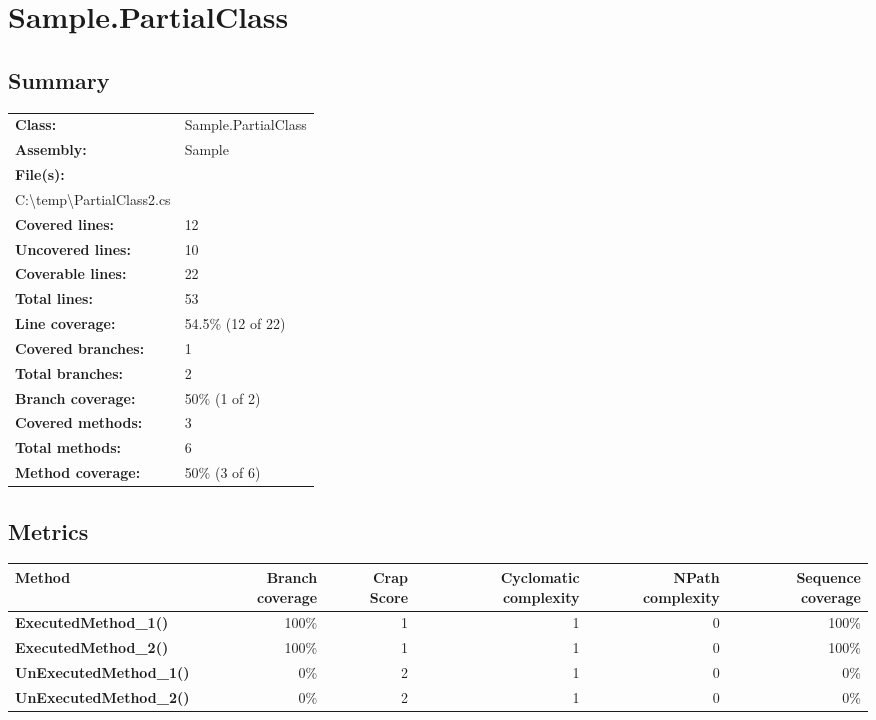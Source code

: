 \documentclass[a4paper,landscape,10pt]{article}
\begin{document}
\section{Sample.PartialClass}
\subsection{Summary}
\begin{longtable}[l]{ll}
\textbf{Class:} & Sample.PartialClass\\
\textbf{Assembly:} & Sample\\
\textbf{File(s):} & \begin{minipage}[t]{12cm}{C:\textbackslash temp\textbackslash PartialClass.cs\\C:\textbackslash temp\textbackslash PartialClass2.cs}\end{minipage} \\
\textbf{Covered lines:} & 12\\
\textbf{Uncovered lines:} & 10\\
\textbf{Coverable lines:} & 22\\
\textbf{Total lines:} & 53\\
\textbf{Line coverage:} & 54.5\% (12 of 22)\\
\textbf{Covered branches:} & 1\\
\textbf{Total branches:} & 2\\
\textbf{Branch coverage:} & 50\% (1 of 2)\\
\textbf{Covered methods:} & 3\\
\textbf{Total methods:} & 6\\
\textbf{Method coverage:} & 50\% (3 of 6)\\
\end{longtable}
\subsection{Metrics}
\begin{longtable}[l]{|l|r|r|r|r|r|}
\hline
\textbf{Method} & \textbf{Branch coverage} & \textbf{Crap Score} & \textbf{Cyclomatic complexity} & \textbf{NPath complexity} & \textbf{Sequence coverage}\\
\hline
\textbf{ExecutedMethod\_1()} & 100\% & 1 & 1 & 0 & 100\%\\
\hline
\textbf{ExecutedMethod\_2()} & 100\% & 1 & 1 & 0 & 100\%\\
\hline
\textbf{UnExecutedMethod\_1()} & 0\% & 2 & 1 & 0 & 0\%\\
\hline
\textbf{UnExecutedMethod\_2()} & 0\% & 2 & 1 & 0 & 0\%\\
\hline
\end{longtable}
\end{document}
